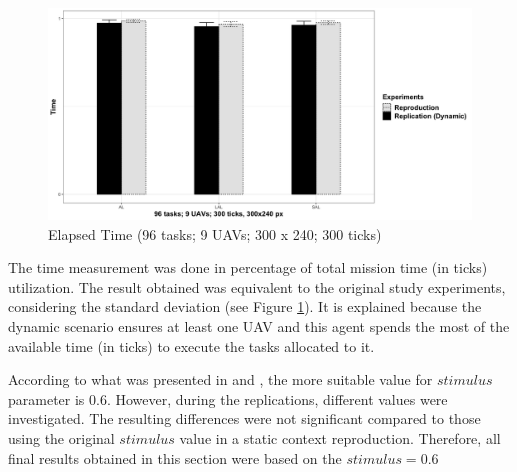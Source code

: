 \begin{figure}[h!]
	\begin{center}
		\includegraphics[scale=0.15]{fig/GRAPH05.png}
		\caption{Elapsed Time (96 tasks; 9 UAVs; 300 x 240; 300 ticks)}
		\label{fig:time}
	\end{center}
\end{figure}

The time measurement was done in percentage of total mission time (in ticks) utilization. The result obtained was equivalent to the original study experiments, considering the standard deviation (see Figure \ref{fig:time}). It is explained because the dynamic scenario ensures at least one UAV and this agent spends the most of the available time (in ticks) to execute the tasks allocated to it.

According to what was presented in \cite{MAS07} and \cite{ferreira2007swarm}, the more suitable value for $stimulus$ parameter is $0.6$. However, during the replications, different values were investigated. The resulting differences were not significant compared to those using the original $stimulus$ value in a static context reproduction. Therefore, all final results obtained in this section were based on the $stimulus = 0.6$